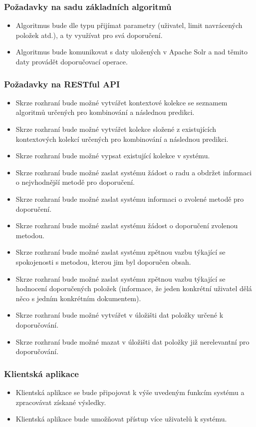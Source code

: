 \documentclass[thesis=M,czech]{FITthesis}[2014/05/07]
\begin{document}
\subsubsection{Požadavky na sadu základních algoritmů}
\begin{itemize}
	\item Algoritmus bude dle typu přijímat parametry (uživatel, limit navrácených položek atd.), a ty využívat pro svá doporučení.
	\item Algoritmus bude komunikovat s daty uložených v Apache Solr a nad těmito daty provádět doporučovací operace.
\end{itemize}

\subsubsection{Požadavky na RESTful API}
\begin{itemize}
	\item Skrze rozhraní bude možné vytvářet kontextové kolekce se seznamem algoritmů určených pro kombinování a následnou predikci.
	\item Skrze rozhraní bude možné vytvářet kolekce složené z existujících kontextových kolekcí určených pro kombinování a následnou predikci.
	\item Skrze rozhraní bude možné vypsat existující kolekce v systému.		
	\item Skrze rozhraní bude možné zaslat systému žádost o radu a obdržet informaci o nejvhodnější metodě pro doporučení.
	\item Skrze rozhraní bude možné zaslat systému informaci o zvolené metodě pro doporučení.
	\item Skrze rozhraní bude možné zaslat systému žádost o doporučení zvolenou metodou.	
	\item Skrze rozhraní bude možné zaslat systému zpětnou vazbu týkající se spokojenosti s metodou, kterou jim byl doporučen obsah.
	\item Skrze rozhraní bude možné zaslat systému zpětnou vazbu týkající se hodnocení doporučených položek (informace, že jeden konkrétní uživatel dělá něco s jedním konkrétním dokumentem).
	\item Skrze rozhraní bude možné vytvářet v úložišti dat položky určené k doporučování. 
	\item Skrze rozhraní bude možné mazat v úložišti dat položky již nerelevantní pro doporučování. 
\end{itemize}

\subsubsection{Klientská aplikace}
\begin{itemize}
	\item Klientská aplikace se bude připojovat k výše uvedeným funkcím systému a zpracovávat získané výsledky.
	\item Klientská aplikace bude umožňovat přístup více uživatelů k systému.	
\end{itemize}	
\end{document}

